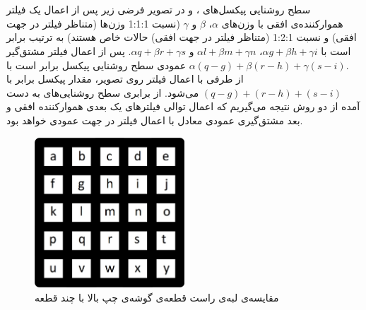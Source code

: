 \documentclass{article}
\begin{document}


\newpage


\section{}%
\subsection{}
سطح روشنایی پیکسل‌های ،  و  در تصویر فرضی زیر پس از اعمال یک فیلتر هموارکننده‌ی افقی با وزن‌های $\alpha$، $\beta$ و $\gamma$ (نسبت 1:1:1 وزن‌ها (متناظر فیلتر  در جهت افقی) و نسبت 1:2:1 (متناظر فیلتر  در جهت افقی) حالات خاص هستند) به ترتیب برابر است با
$
\alpha g + \beta h + \gamma i
$،
$
\alpha l + \beta m + \gamma n
$
و
$
\alpha q + \beta r + \gamma s
$.
پس از اعمال فیلتر مشتق‌گیر عمودی سطح روشنایی پیکسل  برابر است با 
$
\alpha (q - g) + \beta (r - h) + \gamma (s - i)
$. \\
از طرفی با اعمال فیلتر  روی تصویر، مقدار پیکسل  برابر با 
$
(q - g) + (r - h) + (s - i)
$
می‌شود. از برابری سطح روشنایی‌های به دست آمده از دو روش نتیجه می‌گیریم که اعمال توالی فیلترهای یک بعدی هموارکننده افقی و بعد مشتق‌گیری عمودی معادل با اعمال فیلتر  در جهت عمودی خواهد بود.
\begin{figure}[H]
    \centering
    \includegraphics[width=0.5\textwidth]{figures/1p1.jpg}
    \caption
	{
مقایسه‌ی لبه‌ی راست قطعه‌ی گوشه‌ی چپ بالا با چند قطعه
	}
    \label{fig:fig1}
\end{figure}
\end{document}
